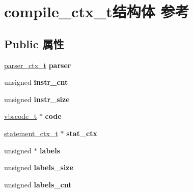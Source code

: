 \hypertarget{structcompile__ctx__t}{}\section{compile\+\_\+ctx\+\_\+t结构体 参考}
\label{structcompile__ctx__t}
\subsection*{Public 属性}
\begin{DoxyCompactItemize}
\item 
\mbox{\label{structcompile__ctx__t_af1f53864feac3afb804333c9bf98cea1}} 
\hyperlink{structparser__ctx__t}{parser\+\_\+ctx\+\_\+t} {\bfseries parser}
\item 
\mbox{\label{structcompile__ctx__t_aa199232574c1c4b6abc8b175f6f067c5}} 
unsigned {\bfseries instr\+\_\+cnt}
\item 
\mbox{\label{structcompile__ctx__t_a81a33a649aabd6ab0ba05be585feddc1}} 
unsigned {\bfseries instr\+\_\+size}
\item 
\mbox{\label{structcompile__ctx__t_aa8528f11c12441d11a9c2828b196c89d}} 
\hyperlink{struct__vbscode__t}{vbscode\+\_\+t} $\ast$ {\bfseries code}
\item 
\mbox{\label{structcompile__ctx__t_ae5f57c212c9a00043bbd994350913f64}} 
\hyperlink{struct__statement__ctx__t}{statement\+\_\+ctx\+\_\+t} $\ast$ {\bfseries stat\+\_\+ctx}
\item 
\mbox{\label{structcompile__ctx__t_acccd49606cb279401162f6e5549ca5a0}} 
unsigned $\ast$ {\bfseries labels}
\item 
\mbox{\label{structcompile__ctx__t_afabc8642ee815a0f26e85d73284ff1e3}} 
unsigned {\bfseries labels\+\_\+size}
\item 
\mbox{\label{structcompile__ctx__t_aafd30d1f3204ec026c83485ad9dd0589}} 
unsigned {\bfseries labels\+\_\+cnt}
\item 
\mbox{\label{structcompile__ctx__t_a5bfd805bcd1fdf0e143a692c74a81be4}} 

\end{DoxyCompactItemize}
